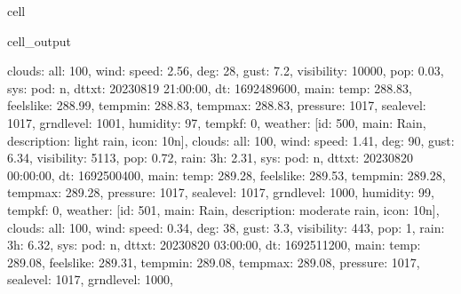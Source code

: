 \documentclass[letterpaper,10pt,english]{jupyterBook}
\begin{document}
\begin{sphinxuseclass}{cell}
\begin{sphinxVerbatimOutput}
\begin{sphinxuseclass}{cell_output}
\begin{sphinxVerbatim}[commandchars=\\\{\}]
\PYGZsq{}clouds\PYGZsq{}: \PYGZob{}\PYGZsq{}all\PYGZsq{}: 100\PYGZcb{}, \PYGZsq{}wind\PYGZsq{}: \PYGZob{}\PYGZsq{}speed\PYGZsq{}: 2.56, \PYGZsq{}deg\PYGZsq{}: 28, \PYGZsq{}gust\PYGZsq{}: 7.2\PYGZcb{}, \PYGZsq{}visibility\PYGZsq{}: 10000, \PYGZsq{}pop\PYGZsq{}: 0.03, \PYGZsq{}sys\PYGZsq{}: \PYGZob{}\PYGZsq{}pod\PYGZsq{}: \PYGZsq{}n\PYGZsq{}\PYGZcb{}, \PYGZsq{}dt\PYGZus{}txt\PYGZsq{}: \PYGZsq{}2023\PYGZhy{}08\PYGZhy{}19 21:00:00\PYGZsq{}\PYGZcb{}, \PYGZob{}\PYGZsq{}dt\PYGZsq{}: 1692489600, \PYGZsq{}main\PYGZsq{}: \PYGZob{}\PYGZsq{}temp\PYGZsq{}: 288.83, \PYGZsq{}feels\PYGZus{}like\PYGZsq{}: 288.99, \PYGZsq{}temp\PYGZus{}min\PYGZsq{}: 288.83, \PYGZsq{}temp\PYGZus{}max\PYGZsq{}: 288.83, \PYGZsq{}pressure\PYGZsq{}: 1017, \PYGZsq{}sea\PYGZus{}level\PYGZsq{}: 1017, \PYGZsq{}grnd\PYGZus{}level\PYGZsq{}: 1001, \PYGZsq{}humidity\PYGZsq{}: 97, \PYGZsq{}temp\PYGZus{}kf\PYGZsq{}: 0\PYGZcb{}, \PYGZsq{}weather\PYGZsq{}: [\PYGZob{}\PYGZsq{}id\PYGZsq{}: 500, \PYGZsq{}main\PYGZsq{}: \PYGZsq{}Rain\PYGZsq{}, \PYGZsq{}description\PYGZsq{}: \PYGZsq{}light rain\PYGZsq{}, \PYGZsq{}icon\PYGZsq{}: \PYGZsq{}10n\PYGZsq{}\PYGZcb{}], \PYGZsq{}clouds\PYGZsq{}: \PYGZob{}\PYGZsq{}all\PYGZsq{}: 100\PYGZcb{}, \PYGZsq{}wind\PYGZsq{}: \PYGZob{}\PYGZsq{}speed\PYGZsq{}: 1.41, \PYGZsq{}deg\PYGZsq{}: 90, \PYGZsq{}gust\PYGZsq{}: 6.34\PYGZcb{}, \PYGZsq{}visibility\PYGZsq{}: 5113, \PYGZsq{}pop\PYGZsq{}: 0.72, \PYGZsq{}rain\PYGZsq{}: \PYGZob{}\PYGZsq{}3h\PYGZsq{}: 2.31\PYGZcb{}, \PYGZsq{}sys\PYGZsq{}: \PYGZob{}\PYGZsq{}pod\PYGZsq{}: \PYGZsq{}n\PYGZsq{}\PYGZcb{}, \PYGZsq{}dt\PYGZus{}txt\PYGZsq{}: \PYGZsq{}2023\PYGZhy{}08\PYGZhy{}20 00:00:00\PYGZsq{}\PYGZcb{}, \PYGZob{}\PYGZsq{}dt\PYGZsq{}: 1692500400, \PYGZsq{}main\PYGZsq{}: \PYGZob{}\PYGZsq{}temp\PYGZsq{}: 289.28, \PYGZsq{}feels\PYGZus{}like\PYGZsq{}: 289.53, \PYGZsq{}temp\PYGZus{}min\PYGZsq{}: 289.28, \PYGZsq{}temp\PYGZus{}max\PYGZsq{}: 289.28, \PYGZsq{}pressure\PYGZsq{}: 1017, \PYGZsq{}sea\PYGZus{}level\PYGZsq{}: 1017, \PYGZsq{}grnd\PYGZus{}level\PYGZsq{}: 1000, \PYGZsq{}humidity\PYGZsq{}: 99, \PYGZsq{}temp\PYGZus{}kf\PYGZsq{}: 0\PYGZcb{}, \PYGZsq{}weather\PYGZsq{}: [\PYGZob{}\PYGZsq{}id\PYGZsq{}: 501, \PYGZsq{}main\PYGZsq{}: \PYGZsq{}Rain\PYGZsq{}, \PYGZsq{}description\PYGZsq{}: \PYGZsq{}moderate rain\PYGZsq{}, \PYGZsq{}icon\PYGZsq{}: \PYGZsq{}10n\PYGZsq{}\PYGZcb{}], \PYGZsq{}clouds\PYGZsq{}: \PYGZob{}\PYGZsq{}all\PYGZsq{}: 100\PYGZcb{}, \PYGZsq{}wind\PYGZsq{}: \PYGZob{}\PYGZsq{}speed\PYGZsq{}: 0.34, \PYGZsq{}deg\PYGZsq{}: 38, \PYGZsq{}gust\PYGZsq{}: 3.3\PYGZcb{}, \PYGZsq{}visibility\PYGZsq{}: 443, \PYGZsq{}pop\PYGZsq{}: 1, \PYGZsq{}rain\PYGZsq{}: \PYGZob{}\PYGZsq{}3h\PYGZsq{}: 6.32\PYGZcb{}, \PYGZsq{}sys\PYGZsq{}: \PYGZob{}\PYGZsq{}pod\PYGZsq{}: \PYGZsq{}n\PYGZsq{}\PYGZcb{}, \PYGZsq{}dt\PYGZus{}txt\PYGZsq{}: \PYGZsq{}2023\PYGZhy{}08\PYGZhy{}20 03:00:00\PYGZsq{}\PYGZcb{}, \PYGZob{}\PYGZsq{}dt\PYGZsq{}: 1692511200, \PYGZsq{}main\PYGZsq{}: \PYGZob{}\PYGZsq{}temp\PYGZsq{}: 289.08, \PYGZsq{}feels\PYGZus{}like\PYGZsq{}: 289.31, \PYGZsq{}temp\PYGZus{}min\PYGZsq{}: 289.08, \PYGZsq{}temp\PYGZus{}max\PYGZsq{}: 289.08, \PYGZsq{}pressure\PYGZsq{}: 1017, \PYGZsq{}sea\PYGZus{}level\PYGZsq{}: 1017, \PYGZsq{}grnd\PYGZus{}level\PYGZsq{}: 1000, 
\end{sphinxVerbatim}
\end{sphinxuseclass}
\end{sphinxVerbatimOutput}
\end{sphinxuseclass}
\end{document}

